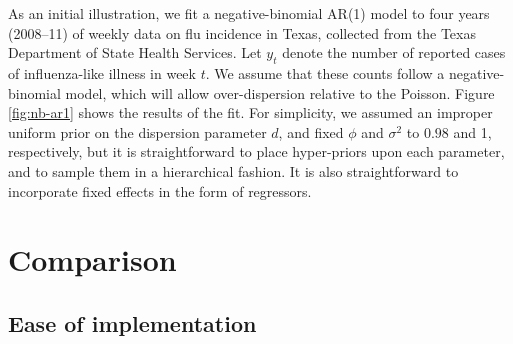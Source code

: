 As an initial illustration, we fit a negative-binomial AR(1) model to four years
(2008--11) of weekly data on flu incidence in Texas, collected from the Texas
Department of State Health Services.  Let $y_t$ denote the number of reported
cases of influenza-like illness in week $t$.  We assume that these counts follow
a negative-binomial model, which will allow over-dispersion relative to the
Poisson.
Figure \ref{fig:nb-ar1} shows the results of the fit. For simplicity, we assumed
an improper uniform prior on the dispersion parameter $d$, and fixed $\phi$ and
$\sigma^2$ to $0.98$ and 1, respectively, but it is straightforward to place
hyper-priors upon each parameter, and to sample them in a hierarchical fashion.
It is also straightforward to incorporate fixed effects in the form of
regressors.


\section{Comparison}

\subsection{Ease of implementation}

